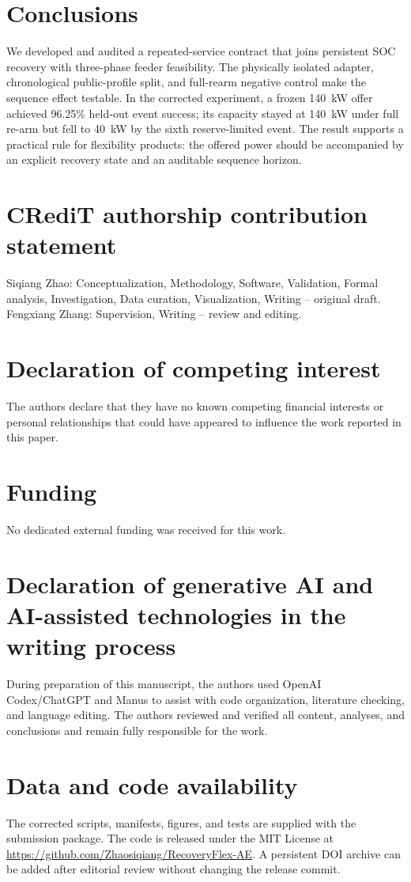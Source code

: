 \documentclass[11pt]{article}
\begin{document}
\section{Conclusions}
We developed and audited a repeated-service contract that joins persistent SOC recovery with three-phase feeder feasibility. The physically isolated adapter, chronological public-profile split, and full-rearm negative control make the sequence effect testable. In the corrected experiment, a frozen \SI{140}{kW} offer achieved 96.25\% held-out event success; its capacity stayed at \SI{140}{kW} under full re-arm but fell to \SI{40}{kW} by the sixth reserve-limited event. The result supports a practical rule for flexibility products: the offered power should be accompanied by an explicit recovery state and an auditable sequence horizon.

\section*{CRediT authorship contribution statement}
Siqiang Zhao: Conceptualization, Methodology, Software, Validation, Formal analysis, Investigation, Data curation, Visualization, Writing -- original draft. Fengxiang Zhang: Supervision, Writing -- review and editing.

\section*{Declaration of competing interest}
The authors declare that they have no known competing financial interests or personal relationships that could have appeared to influence the work reported in this paper.

\section*{Funding}
No dedicated external funding was received for this work.

\section*{Declaration of generative AI and AI-assisted technologies in the writing process}
During preparation of this manuscript, the authors used OpenAI Codex/ChatGPT and Manus to assist with code organization, literature checking, and language editing. The authors reviewed and verified all content, analyses, and conclusions and remain fully responsible for the work.

\section*{Data and code availability}
The corrected scripts, manifests, figures, and tests are supplied with the submission package. The code is released under the MIT License at \url{https://github.com/Zhaosiqiang/RecoveryFlex-AE}. A persistent DOI archive can be added after editorial review without changing the release commit.



\end{document}
